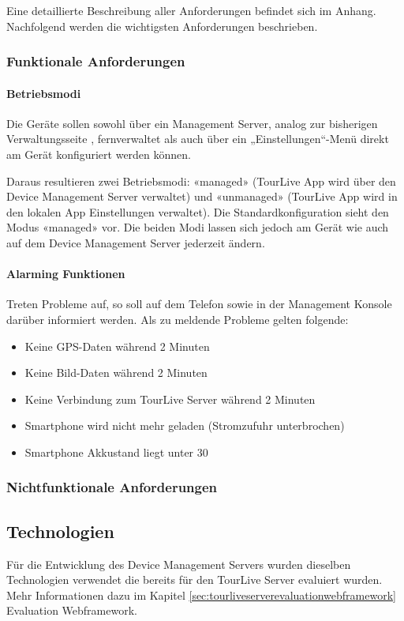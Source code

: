 Eine detaillierte Beschreibung aller Anforderungen befindet sich im Anhang. Nachfolgend werden die wichtigsten Anforderungen beschrieben.

\subsubsection{Funktionale Anforderungen}
\paragraph{Betriebsmodi}
Die Geräte sollen sowohl über ein Management Server, analog zur bisherigen Verwaltungsseite , fernverwaltet als auch über ein „Einstellungen“-Menü direkt am Gerät konfiguriert werden können. 

Daraus resultieren zwei Betriebsmodi: «managed» (TourLive App wird über den Device Management Server verwaltet) und «unmanaged» (TourLive App wird in den lokalen App Einstellungen verwaltet). Die Standardkonfiguration sieht den Modus «managed» vor. Die beiden Modi lassen sich jedoch am Gerät wie auch auf dem Device Management Server jederzeit ändern. 


\paragraph{Alarming Funktionen}
Treten Probleme auf, so soll auf dem Telefon sowie in der Management Konsole darüber informiert werden. Als zu meldende Probleme gelten folgende:
\begin{itemize}
\item Keine GPS-Daten während 2 Minuten
\item Keine Bild-Daten während 2 Minuten
\item Keine Verbindung zum TourLive Server während 2 Minuten
\item Smartphone wird nicht mehr geladen (Stromzufuhr unterbrochen)
\item Smartphone Akkustand liegt unter 30%
\end{itemize}
	
\subsubsection{Nichtfunktionale Anforderungen}

\subsection{Technologien}
Für die Entwicklung des Device Management Servers wurden dieselben Technologien verwendet die bereits für den TourLive Server evaluiert wurden. Mehr Informationen dazu im Kapitel  \ref{sec:tourliveserverevaluationwebframework} Evaluation Webframework.

